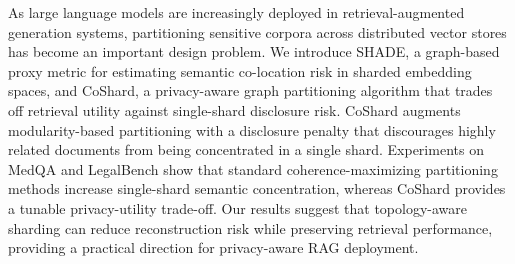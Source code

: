 As large language models are increasingly deployed in retrieval-augmented generation systems, partitioning sensitive corpora across distributed vector stores has become an important design problem. We introduce SHADE, a graph-based proxy metric for estimating semantic co-location risk in sharded embedding spaces, and CoShard, a privacy-aware graph partitioning algorithm that trades off retrieval utility against single-shard disclosure risk. CoShard augments modularity-based partitioning with a disclosure penalty that discourages highly related documents from being concentrated in a single shard. Experiments on MedQA and LegalBench show that standard coherence-maximizing partitioning methods increase single-shard semantic concentration, whereas CoShard provides a tunable privacy-utility trade-off. Our results suggest that topology-aware sharding can reduce reconstruction risk while preserving retrieval performance, providing a practical direction for privacy-aware RAG deployment.
